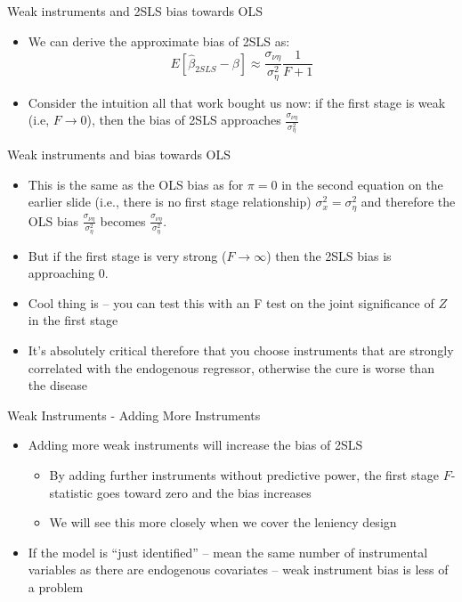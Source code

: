 \documentclass{beamer}
\begin{document}
\begin{frame}{Weak instruments and 2SLS bias towards OLS}
	
	\begin{itemize}
	\item We can derive the approximate bias of 2SLS as:$$E[\widehat{\beta}_{2SLS} - \beta] \approx \frac{\sigma_{\nu \eta}}{\sigma^2_\eta} \frac{1}{F+1}$$
	\item Consider the intuition all that work bought us now: if the first stage is weak (i.e, $F\rightarrow{0}$), then the bias of 2SLS approaches $\frac{\sigma_{\nu \eta}}{\sigma^2_\eta}$
	\end{itemize}
\end{frame}

\begin{frame}{Weak instruments and bias towards OLS}

\begin{itemize}
	\item This is the same as the OLS bias as for $\pi=0$ in the second equation on the earlier slide (i.e., there is no first stage relationship) $\sigma^2_x = \sigma^2_\eta$ and therefore the OLS bias $\frac{\sigma_{\nu \eta}}{\sigma^2_\eta}$ becomes $\frac{\sigma_{\nu \eta}}{\sigma^2_\eta}$.
	\item But if the first stage is very strong ($F\rightarrow{\infty}$) then the 2SLS bias is approaching 0.
	\item Cool thing is -- you can test this with an F test on the joint significance of $Z$ in the first stage
	\item It's absolutely critical therefore that you choose instruments that are strongly correlated with the endogenous regressor, otherwise the cure is worse than the disease
\end{itemize}

\end{frame}

\begin{frame}{Weak Instruments - Adding More Instruments}
	
	\begin{itemize}
	\item Adding more weak instruments will increase the bias of 2SLS
		\begin{itemize}
		\item By adding further instruments without predictive power, the first stage $F$-statistic goes toward zero and the bias increases
		\item We will see this more closely when we cover the leniency design
		\end{itemize}
	\item If the model is ``just identified'' -- mean the same number of instrumental variables as there are endogenous covariates -- weak instrument bias is less of a problem
	\end{itemize}
\end{frame}
\end{document}
